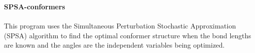 \documentclass{article}
\begin{document}
\textbf{SPSA-conformers}\\\\
This program uses the Simultaneous Perturbation Stochastic Approximation (SPSA) algorithm to find the optimal conformer structure when the bond lengths are known and the angles are the independent variables being optimized.
\end{document}
